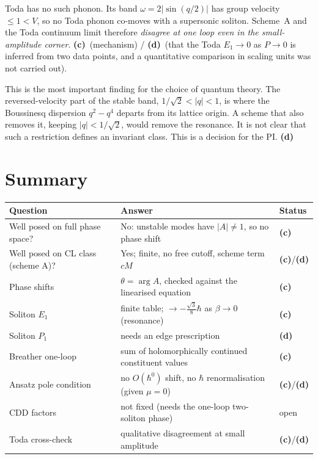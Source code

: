 \documentclass[11pt,a4paper]{article}
\newcommand{\Lc}{\textsf{\textbf{(c)}}}
\newcommand{\Ld}{\textsf{\textbf{(d)}}}
\theoremstyle{remark}\newtheorem{remark}[proposition]{Remark}
\begin{document}
Toda has no such phonon. Its band $\omega=2|\sin(q/2)|$ has group velocity $\le1<V$, so no Toda phonon co-moves with a supersonic soliton. Scheme~A and the Toda continuum limit therefore \emph{disagree at one loop even in the small-amplitude corner}. \Lc\ (mechanism) / \Ld\ (that the Toda $E_1\to0$ as $P\to0$ is inferred from two data points, and a quantitative comparison in scaling units was not carried out).

This is the most important finding for the choice of quantum theory. The reversed-velocity part of the stable band, $1/\sqrt2<|q|<1$, is where the Boussinesq dispersion $q^2-q^4$ departs from its lattice origin. A scheme that also removes it, keeping $|q|<1/\sqrt2$, would remove the resonance. It is not clear that such a restriction defines an invariant class. This is a decision for the PI. \Ld

\section{Summary}
\begin{center}\small
\begin{tabular}{@{}p{5cm}p{7.5cm}p{2cm}@{}}\toprule
Question & Answer & Status\\\midrule
Well posed on full phase space? & No: unstable modes have $|A|\ne1$, so no phase shift & \Lc\\
Well posed on CL class (scheme A)? & Yes; finite, no free cutoff, scheme term $cM$ & \Lc/\Ld\\
Phase shifts & $\theta=\arg A$, checked against the linearised equation & \Lc\\
Soliton $E_1$ & finite table; $\to-\frac{\sqrt3}8\hbar$ as $\beta\to0$ (resonance) & \Lc\\
Soliton $P_1$ & needs an edge prescription & \Ld\\
Breather one-loop & sum of holomorphically continued constituent values & \Lc\\
Ansatz pole condition & no $O(\hbar^0)$ shift, no $\hbar$ renormalisation (given $\mu=0$) & \Lc/\Ld\\
CDD factors & not fixed (needs the one-loop two-soliton phase) & open\\
Toda cross-check & qualitative disagreement at small amplitude & \Lc/\Ld\\
\bottomrule\end{tabular}\end{center}
\end{document}
